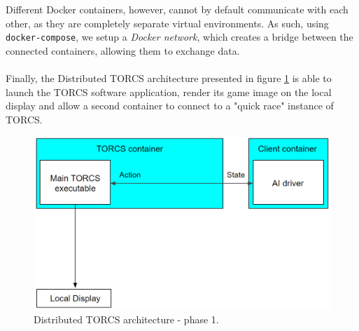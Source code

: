 Different Docker containers, however, cannot by default communicate with each other, as they are completely separate virtual environments. As such, using \texttt{docker-compose}, we setup a \textit{Docker network}, which creates a bridge between the connected containers, allowing them to exchange data. \\ \\
Finally, the Distributed TORCS architecture presented in figure \ref{fig:development-1} is able to launch the TORCS software application, render its game image on the local display and allow a second container to connect to a "quick race" instance of TORCS.
\begin{figure}[h!]
	\centering
	\includegraphics[width=0.8\linewidth]{"immagini/Software development/Development-1"}
	\caption[Distributed TORCS architecture - phase 1.]{Distributed TORCS architecture - phase 1.}
	\label{fig:development-1}
\end{figure}
 

